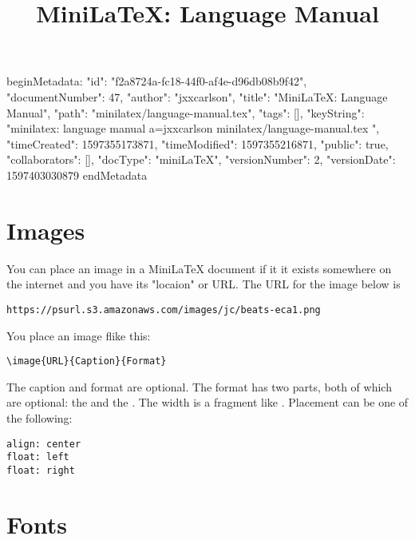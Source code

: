 beginMetadata:
{
    "id": "f2a8724a-fc18-44f0-af4e-d96db08b9f42",
    "documentNumber": 47,
    "author": "jxxcarlson",
    "title": "MiniLaTeX: Language Manual",
    "path": "minilatex/language-manual.tex",
    "tags": [],
    "keyString": "minilatex: language manual a=jxxcarlson minilatex/language-manual.tex ",
    "timeCreated": 1597355173871,
    "timeModified": 1597355216871,
    "public": true,
    "collaborators": [],
    "docType": "miniLaTeX",
    "versionNumber": 2,
    "versionDate": 1597403030879
}
endMetadata

\title{MiniLaTeX: Language Manual}

\maketitle

\tableofcontents


\section{Images}

You can place an image in a MiniLaTeX document if it it exists somewhere on the internet and you have its "locaion" or URL.  The URL for the image below is

\begin{verbatim}
https://psurl.s3.amazonaws.com/images/jc/beats-eca1.png
\end{verbatim}

You place an image flike this:

\begin{verbatim}
\image{URL}{Caption}{Format}
\end{verbatim}

The caption and format are optional.  The format has two parts, both of which are optional: the  and the . The width is a fragment like .  Placement can be one of the following:

\begin{verbatim}
align: center
float: left
float: right
\end{verbatim}


\section{Fonts}

